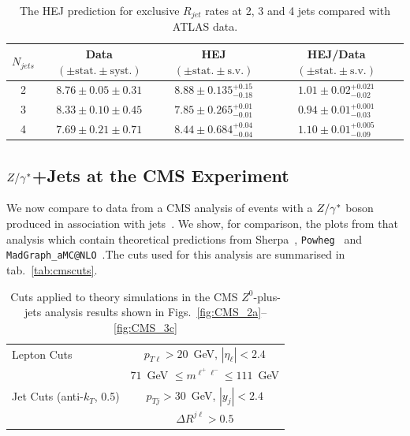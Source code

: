 		\begin{table}[!h]
			\begin{center}
			\begin{tabular}{| c | c | c | c |}
		        \hline
			$N_{jets}$ & Data $(\pm \text{stat.}\pm \text{syst.})$ & HEJ $(\pm \text{stat.}\pm \text{s.v.})$ & HEJ/Data $(\pm \text{stat.}\pm \text{s.v.})$ \\ \hline
			2 & $8.76\pm0.05\pm0.31$ & $8.88\pm0.135^{+0.15}_{-0.18}$ & $1.01\pm0.02^{+0.021}_{-0.02}$ \\ \hline
			3 & $8.33\pm0.10\pm0.45$ & $7.85\pm0.265^{+0.01}_{-0.01}$ & $0.94\pm0.01^{+0.001}_{-0.03}$ \\ \hline
			4 & $7.69\pm0.21\pm0.71$ & $8.44\pm0.684^{+0.04}_{-0.04}$ & $1.10\pm0.01^{+0.005}_{-0.09}$ \\ \hline
			\end{tabular}
			\caption{The HEJ prediction for exclusive $R_{jet}$ rates at 2, 3 and 4 jets compared with ATLAS data.}
			\label{tab:RJetsExcl}
			\end{center}
		\end{table}

	\subsection{$Z/\gamma^*$+Jets at the CMS Experiment}
		\label{sub:CMS}

		We now compare to data from a CMS analysis of events with a $Z/\gamma^*$ boson produced
		in association with jets~\cite{Khachatryan:2014zya}.  We show, for comparison,
		the plots from that analysis which contain theoretical predictions from
		Sherpa~\cite{Gleisberg:2008ta,Hoeche:2012yf}, \texttt{Powheg}~\cite{Alioli:2010qp} and
		\texttt{MadGraph\_aMC@NLO}~\cite{Alwall:2014hca}.The cuts used for this analysis are summarised in
		tab.~\eqref{tab:cmscuts}.

		\begin{table}[hbt]
		  \centering
		  \begin{tabular}{|l|c|}
		    \hline
		    Lepton Cuts & $p_{T\ell}>20$~GeV, \; $|\eta_\ell|<2.4$ \\
		    &\; $71$~GeV $\leq m^{\ell^+\ell^-} \leq
		      111$~GeV \\ \hline
		    Jet Cuts (anti-$k_T$, 0.5) & $p_{Tj}>30$~GeV, \; $|y_j|<2.4$ \\
		    & $\Delta R^{j\ell} >0.5$ \\
		\hline
		  \end{tabular}
		  \caption{Cuts applied to theory simulations in the CMS
		    $Z^0$-plus-jets analysis results shown in
		    Figs.~\eqref{fig:CMS_2a}--\eqref{fig:CMS_3c}}
		  \label{tab:cmscuts}
		\end{table}

